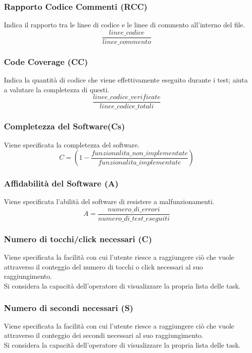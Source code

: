 \subsubsection{Rapporto Codice Commenti (RCC)}
Indica il rapporto tra le linee di codice e le linee di commento all'interno del file.
\[\frac{linee\_codice}{linee\_commento}\]

\subsubsection{Code Coverage (CC)}
Indica la quantità di codice che viene effettivamente eseguito durante i test; aiuta a valutare la completezza di questi.
\[\frac{linee\_codice\_verificate}{linee\_codice\_totali}\]

\subsubsection{Completezza del Software(Cs)}
Viene specificata la completezza del software.
\[C = (1- \frac{funzionalita\_non\_implementate }{funzionalita\_implementate})\]

\subsubsection{Affidabilità del Software (A)}
Viene specificata l'abilità del software di resistere a malfunzionamenti.
\[A = \frac{numero\_di\_errori}{numero\_di\_test\_eseguiti}\]

\subsubsection{Numero di tocchi/click necessari (C)}
Viene specificata la facilità con cui l'utente riesce a raggiungere ciò che vuole attraverso il conteggio del numero di tocchi o click necessari al suo raggiungimento.\\
Si considera la capacità dell'operatore di visualizzare la propria lista delle task.

\subsubsection{Numero di secondi necessari (S)}
Viene specificata la facilità con cui l'utente riesce a raggiungere ciò che vuole attraverso il conteggio dei secondi necessari al suo raggiungimento.\\
Si considera la capacità dell'operatore di visualizzare la propria lista delle task.

